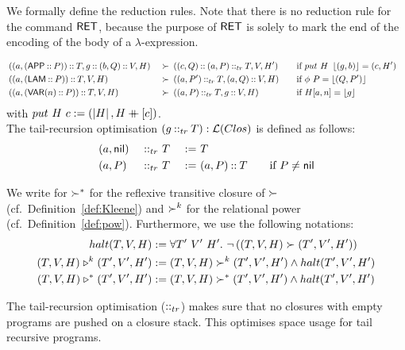 We formally define the reduction rules.  Note that there is no reduction rule for the command $\mathsf{RET}$, because the purpose of $\mathsf{RET}$ is solely
to mark the end of the encoding of the body of a $\lambda$-expression.
\begin{definition}
  {\small
    \begin{alignat*}{4}
      & \left((a, (\mathsf{APP} \mathbin{::} P)) \mathbin{::} T, g \mathbin{::} (b, Q) \mathbin{::} V, H\right) &~\succ~& \left((c, Q) \mathbin{::} (a,P) \mathbin{::}_{tr} T, V, H'\right)
      \quad&& \text{if $put~H~\left\lfloor {(g,b)} \right\rfloor = (c,H')$} \\
      & \left((a, (\mathsf{LAM} \mathbin{::} P)) \mathbin{::} T, V, H\right)                      &~\succ~& \left((a, P') \mathbin{::}_{tr} T, (a,Q) \mathbin{::} V, H\right)
      \quad&& \text{if $\phi~P = \left\lfloor {(Q, P')} \right\rfloor$} & \\
      & \left((a, (\mathsf{VAR}(n) \mathbin{::} P)) \mathbin{::} T, V, H\right)                   &~\succ~& \left((a, P) \mathbin{::}_{tr} T, g \mathbin{::} V, H\right)
      \quad&& \text{if $H[a,n]=\left\lfloor {g} \right\rfloor$} &
    \end{alignat*}
  }
  with $put~H~c := (\left| H \right|, H \mathbin{+\mkern-10mu+} [c]) $.\\
  The tail-recursion optimisation $(g \mathbin{::}_{tr} T) : \mathcal{L}(Clos)$ is defined as follows:
  \begin{alignat*}{3}
    & (a, \mathsf{nil}) &~\mathbin{::}_{tr}~& T &~:=~& T \\
    & (a, P   ) &~\mathbin{::}_{tr}~& T &~:=~& (a, P) \mathbin{::} T \qquad\text{if $P \neq \mathsf{nil}$}
  \end{alignat*}

  We write for $\succ^*$ for the reflexive transitive closure of $\succ$ (cf.\ Definition~\ref{def:Kleene}) and $\succ^k$ for the relational power (cf.\
  Definition~\ref{def:pow}).  Furthermore, we use the following notations:
  \begin{align*}
                         halt(T,V,H) &:= \forall T'~V'~H'.~\lnot \left((T,V,H) \succ (T',V',H')\right) \\
    (T,V,H) \mathrel{\triangleright}^k (T',V',H') &:= (T,V,H) \succ^k (T',V',H') \land halt(T',V',H') \\
    (T,V,H) \mathrel{\triangleright}^* (T',V',H') &:= (T,V,H) \succ^* (T',V',H') \land halt(T',V',H')
  \end{align*}
\end{definition}

The tail-recursion optimisation ($\mathbin{::}_{tr}$) makes sure that no closures with empty programs are pushed on a closure stack.  This optimises space
usage for tail recursive programs.

